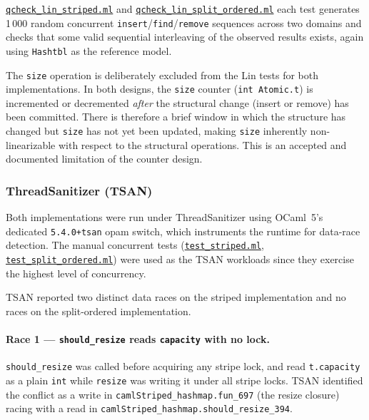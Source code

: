 \documentclass[11pt,a4paper]{article}
\begin{document}
\href{https://github.com/ogirala-srihasa/Concurrent-Hashmap/blob/main/test/qcheck_lin_striped.ml}{\texttt{qcheck\_lin\_striped.ml}} and \href{https://github.com/ogirala-srihasa/Concurrent-Hashmap/blob/main/test/qcheck_lin_split_ordered.ml}{\texttt{qcheck\_lin\_split\_ordered.ml}} each test generates 1\,000 random
concurrent \texttt{insert}/\texttt{find}/\texttt{remove} sequences across two
domains and checks that some valid sequential interleaving of the observed
results exists, again using \texttt{Hashtbl} as the reference model.

The \texttt{size} operation is deliberately excluded from the Lin tests for
both implementations. In both designs, the \texttt{size} counter
(\texttt{int Atomic.t}) is incremented or decremented \emph{after} the
structural change (insert or remove) has been committed. There is therefore
a brief window in which the structure has changed but \texttt{size} has not
yet been updated, making \texttt{size} inherently non-linearizable with
respect to the structural operations. This is an accepted and documented
limitation of the counter design.

\subsubsection{ThreadSanitizer (TSAN)}
\label{sec:tsan}

Both implementations were run under ThreadSanitizer using OCaml~5's dedicated
\texttt{5.4.0+tsan} opam switch, which instruments the runtime for data-race
detection. The manual concurrent tests (\href{https://github.com/ogirala-srihasa/Concurrent-Hashmap/blob/main/test/test_striped.ml}{\texttt{test\_striped.ml}},
\href{https://github.com/ogirala-srihasa/Concurrent-Hashmap/blob/main/test/test_split_ordered.ml}{\texttt{test\_split\_ordered.ml}}) were used as the TSAN workloads since they
exercise the highest level of concurrency.

TSAN reported two distinct data races on the striped implementation and no
races on the split-ordered implementation.

\paragraph{Race 1 — \texttt{should\_resize} reads \texttt{capacity} with no lock.}
\texttt{should\_resize} was called before acquiring any stripe lock, and read
\texttt{t.capacity} as a plain \texttt{int} while \texttt{resize} was writing
it under all stripe locks. TSAN identified the conflict as a write in
\texttt{camlStriped\_hashmap.fun\_697} (the resize closure) racing with a
read in \texttt{camlStriped\_hashmap.should\_resize\_394}.
\end{document}
